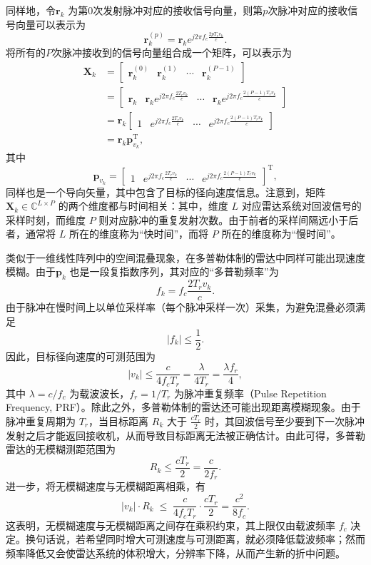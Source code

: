 同样地，令\( \bm{r}_k \) 为第0次发射脉冲对应的接收信号向量，则第\( p \)次脉冲对应的接收信号向量可以表示为
\[
    \bm{r}_k^{(p)} = \bm{r}_k e^{j 2 \pi f_c \frac{2 p T_r v_k}{c}}.
\]
将所有的\( P \)次脉冲接收到的信号向量组合成一个矩阵，可以表示为
\[
    \begin{split}
        \mathbf{X}_k & = \begin{bmatrix}
                             \bm{r}_k^{(0)} & \bm{r}_k^{(1)} & \cdots & \bm{r}_k^{(P-1)}
                         \end{bmatrix}                                                             \\
                     & = \begin{bmatrix}
                             \bm{r}_k & \bm{r}_k e^{j 2 \pi f_c \frac{2 T_r v_k}{c}} & \cdots & \bm{r}_k e^{j 2 \pi f_c \frac{2 (P-1) T_r v_k}{c}}
                         \end{bmatrix} \\
                     & = \bm{r}_k \begin{bmatrix}
                                      1 & e^{j 2 \pi f_c \frac{2 T_r v_k}{c}} & \cdots & e^{j 2 \pi f_c \frac{2 (P-1) T_r v_k}{c}}
                                  \end{bmatrix}                 \\
                     & = \bm{r}_k \bm{p}_{v_k}^{\mathrm{T}},
    \end{split}
\]
其中
\[
    \bm{p}_{v_k} = \begin{bmatrix}
        1 & e^{j 2 \pi f_c \frac{2 T_r v_k}{c}} & \cdots & e^{j 2 \pi f_c \frac{2 (P-1) T_r v_k}{c}}
    \end{bmatrix}^{\mathrm{T}},
\]
同样也是一个导向矢量，其中包含了目标的径向速度信息。注意到，矩阵 \( \mathbf{X}_k \in \mathbb{C}^{L \times P} \) 的两个维度都与时间相关：其中，维度 \(L\) 对应雷达系统对回波信号的采样时刻，而维度 \(P\) 则对应脉冲的重复发射次数。由于前者的采样间隔远小于后者，通常将 \(L\) 所在的维度称为“快时间”，而将 \(P\) 所在的维度称为“慢时间”。

类似于一维线性阵列中的空间混叠现象，在多普勒体制的雷达中同样可能出现速度模糊。由于\(\bm{p}_k\) 也是一段复指数序列，其对应的“多普勒频率”为
\[
    f_k = f_c \frac{2 T_r v_k}{c}.
\]
由于脉冲在慢时间上以单位采样率（每个脉冲采样一次）采集，为避免混叠必须满足
\[
    |f_k| \leq \frac{1}{2}.
\]
因此，目标径向速度的可测范围为
\[
    |v_k| \leq \frac{c}{4 f_c T_r}
    = \frac{\lambda}{4 T_r}
    = \frac{\lambda f_r}{4},
\]
其中 \(\lambda = c/f_c\) 为载波波长，\(f_r = 1/T_r\) 为脉冲重复频率（Pulse Repetition Frequency, PRF）。除此之外，多普勒体制的雷达还可能出现距离模糊现象。由于脉冲重复周期为 \(T_r\)，当目标距离 \(R_k\) 大于 \(\tfrac{c T_r}{2}\) 时，其回波信号至少要到下一次脉冲发射之后才能返回接收机，从而导致目标距离无法被正确估计。由此可得，多普勒雷达的无模糊测距范围为
\[
    R_k \leq \frac{c T_r}{2} = \frac{c}{2 f_r}.
\]
进一步，将无模糊速度与无模糊距离相乘，有
\[
    |v_k| \cdot R_k \;\leq\;
    \frac{c}{4 f_c T_r} \cdot \frac{c T_r}{2}
    = \frac{c^2}{8 f_c}.
\]
这表明，无模糊速度与无模糊距离之间存在乘积约束，其上限仅由载波频率 \(f_c\) 决定。换句话说，若希望同时增大可测速度与可测距离，就必须降低载波频率；然而频率降低又会使雷达系统的体积增大，分辨率下降，从而产生新的折中问题。

